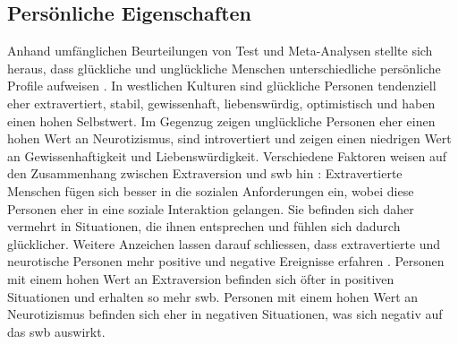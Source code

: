 \subsection{Persönliche Eigenschaften}\label{subsec.swbPersTraits}
Anhand umfänglichen Beurteilungen von Test und Meta-Analysen stellte sich heraus, dass glückliche und unglückliche Menschen unterschiedliche persönliche Profile aufweisen \cite{Diener:1999, Steel:2008}. In westlichen Kulturen sind glückliche Personen tendenziell eher extravertiert, stabil, gewissenhaft, liebenswürdig, optimistisch und haben einen hohen Selbstwert. Im Gegenzug zeigen unglückliche Personen eher einen hohen Wert an Neurotizismus, sind introvertiert und zeigen einen niedrigen Wert an Gewissenhaftigkeit und Liebenswürdigkeit. \newline
Verschiedene Faktoren weisen auf den Zusammenhang zwischen Extraversion und \gls{swb} hin \cite{Diener:1999}: Extravertierte Menschen fügen sich besser in die sozialen Anforderungen ein, wobei diese Personen eher in eine soziale Interaktion gelangen. Sie befinden sich daher vermehrt in Situationen, die ihnen entsprechen und fühlen sich dadurch glücklicher. Weitere Anzeichen lassen darauf schliessen, dass extravertierte und neurotische Personen mehr positive und negative Ereignisse erfahren \cite{Carr:2011}. Personen mit einem hohen Wert an Extraversion befinden sich öfter in positiven Situationen und erhalten so mehr \gls{swb}. Personen mit einem hohen Wert an Neurotizismus befinden sich eher in negativen Situationen, was sich negativ auf das \gls{swb} auswirkt.	


